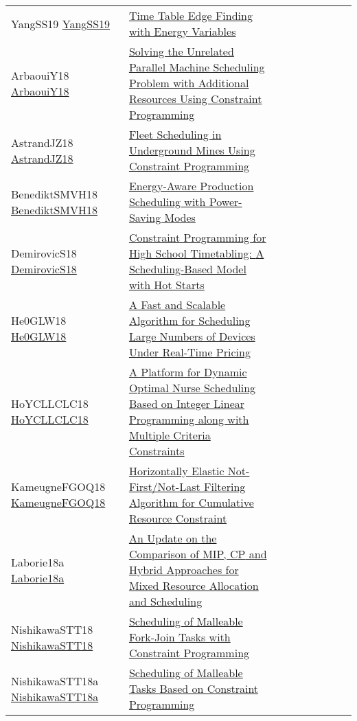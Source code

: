 {\begin{longtable}{p{3cm}p{7cm}lllllll}
YangSS19 \href{https://doi.org/10.1007/978-3-030-19212-9\_42}{YangSS19} &  \href{papers/YangSS19.pdf}{Time Table Edge Finding with Energy Variables} &  &  &  &  &  &  & \\
ArbaouiY18 \href{https://doi.org/10.1007/978-3-319-75420-8\_67}{ArbaouiY18} &  \href{papers/ArbaouiY18.pdf}{Solving the Unrelated Parallel Machine Scheduling Problem with Additional Resources Using Constraint Programming} &  &  &  &  &  &  & \\
AstrandJZ18 \href{https://doi.org/10.1007/978-3-319-93031-2\_44}{AstrandJZ18} &  \href{papers/AstrandJZ18.pdf}{Fleet Scheduling in Underground Mines Using Constraint Programming} &  &  &  &  &  &  & \\
BenediktSMVH18 \href{https://doi.org/10.1007/978-3-319-93031-2\_6}{BenediktSMVH18} &  \href{papers/BenediktSMVH18.pdf}{Energy-Aware Production Scheduling with Power-Saving Modes} &  &  &  &  &  &  & \\
DemirovicS18 \href{https://doi.org/10.1007/978-3-319-93031-2\_10}{DemirovicS18} &  \href{papers/DemirovicS18.pdf}{Constraint Programming for High School Timetabling: {A} Scheduling-Based Model with Hot Starts} &  &  &  &  &  &  & \\
He0GLW18 \href{https://doi.org/10.1007/978-3-319-98334-9\_42}{He0GLW18} &  \href{papers/He0GLW18.pdf}{A Fast and Scalable Algorithm for Scheduling Large Numbers of Devices Under Real-Time Pricing} &  &  &  &  &  &  & \\
HoYCLLCLC18 \href{https://doi.org/10.1145/3299819.3299825}{HoYCLLCLC18} &  \href{}{A Platform for Dynamic Optimal Nurse Scheduling Based on Integer Linear Programming along with Multiple Criteria Constraints} &  &  &  &  &  &  & \\
KameugneFGOQ18 \href{https://doi.org/10.1007/978-3-319-93031-2\_23}{KameugneFGOQ18} &  \href{papers/KameugneFGOQ18.pdf}{Horizontally Elastic Not-First/Not-Last Filtering Algorithm for Cumulative Resource Constraint} &  &  &  &  &  &  & \\
Laborie18a \href{https://doi.org/10.1007/978-3-319-93031-2\_29}{Laborie18a} &  \href{papers/Laborie18a.pdf}{An Update on the Comparison of MIP, {CP} and Hybrid Approaches for Mixed Resource Allocation and Scheduling} &  &  &  &  &  &  & \\
NishikawaSTT18 \href{https://doi.org/10.1109/CANDAR.2018.00025}{NishikawaSTT18} &  \href{papers/NishikawaSTT18.pdf}{Scheduling of Malleable Fork-Join Tasks with Constraint Programming} &  &  &  &  &  &  & \\
NishikawaSTT18a \href{https://doi.org/10.1109/TENCON.2018.8650168}{NishikawaSTT18a} &  \href{papers/NishikawaSTT18a.pdf}{Scheduling of Malleable Tasks Based on Constraint Programming} &  &  &  &  &  &  & \\

\end{longtable}}
